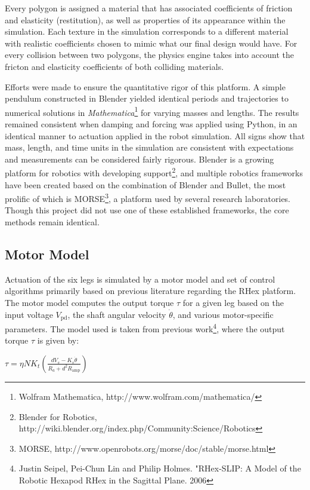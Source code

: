 \documentclass[11pt]{article}
\begin{document}
Every polygon is assigned a material that has associated coefficients of friction and elasticity (restitution), as well as properties of its appearance within the simulation. Each texture in the simulation corresponds to a different material with realistic coefficients chosen to mimic what our final design would have. For every collision between two polygons, the physics engine takes into account the fricton and elasticity coefficients of both colliding materials.

Efforts were made to ensure the quantitative rigor of this platform. A simple pendulum constructed in Blender yielded identical periods and trajectories to numerical solutions in \textit{Mathematica}\footnote{Wolfram Mathematica, http://www.wolfram.com/mathematica/} for varying masses and lengths. The results remained consistent when damping and forcing was applied using Python, in an identical manner to actuation applied in the robot simulation. All signs show that mass, length, and time units in the simulation are consistent with expectations and measurements can be considered fairly rigorous. Blender is a growing platform for robotics with developing support\footnote{Blender for Robotics, http://wiki.blender.org/index.php/Community:Science/Robotics}, and multiple robotics frameworks have been created based on the combination of Blender and Bullet, the most prolific of which
is MORSE\footnote{MORSE, http://www.openrobots.org/morse/doc/stable/morse.html}, a platform used by several research laboratories. Though this project did not use one of these established frameworks, the core methods
remain identical.

\subsection{Motor Model}

Actuation of the six legs is simulated by a motor model and set of control algorithms primarily based on previous literature regarding the RHex platform.
The motor model computes the output torque $\tau $ for a given leg based on the input voltage \(V_{\text{pd}}\), the shaft angular velocity \(\dot{\theta
}\), and various motor-specific parameters. The model used is taken from previous work\footnote{Justin Seipel, Pei-Chun Lin and Philip Holmes. "RHex-SLIP: A Model of the Robotic Hexapod RHex in the Sagittal Plane. 2006}, where the output torque $\tau $ is given by:

\begin{center}
\(\tau =\eta  N K_t \left(\frac{d V_s-K_s\dot{\theta }}{R_a+d^2R_{\text{amp}}}\right)\)
\end{center}
\end{document}

